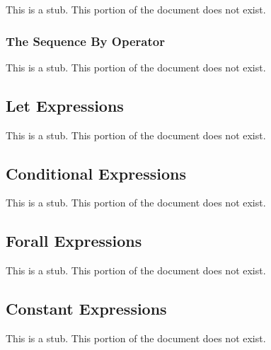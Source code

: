 This is a stub.  This portion of the document does not exist.

\subsubsection{The Sequence By Operator}
\label{The_Sequence_By_Operator}

This is a stub.  This portion of the document does not exist.

\subsection{Let Expressions}
\label{Let_Expressions}

This is a stub.  This portion of the document does not exist.

\subsection{Conditional Expressions}
\label{Conditional_Expressions}

This is a stub.  This portion of the document does not exist.

\subsection{Forall Expressions}
\label{Forall_Expressions}

This is a stub.  This portion of the document does not exist.

\subsection{Constant Expressions}
\label{Constant_Expressions}

This is a stub.  This portion of the document does not exist.
